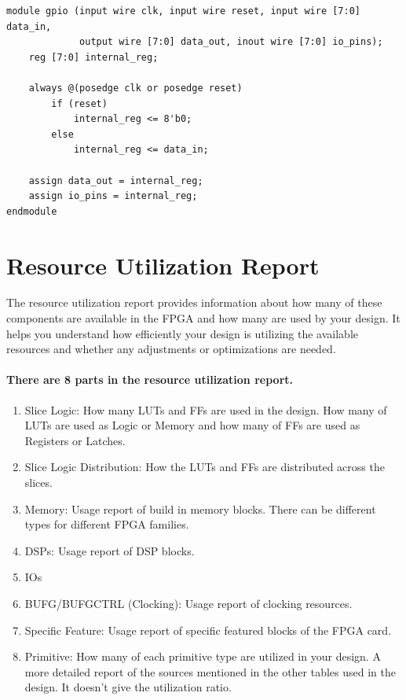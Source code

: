 \documentclass{report}
\begin{document}
\begin{verbatim}
module gpio (input wire clk, input wire reset, input wire [7:0] data_in,
             output wire [7:0] data_out, inout wire [7:0] io_pins);
    reg [7:0] internal_reg;
    
    always @(posedge clk or posedge reset)
        if (reset)
            internal_reg <= 8'b0;
        else
            internal_reg <= data_in;
    
    assign data_out = internal_reg;
    assign io_pins = internal_reg;
endmodule
\end{verbatim}

\section{Resource Utilization Report}

The resource utilization report provides information about how many of these components are available in the FPGA and how many are used by your design. It helps you understand how efficiently your design is utilizing the available resources and whether any adjustments or optimizations are needed.

\paragraph{There are 8 parts in the resource utilization report.}
\begin{enumerate}
    \item Slice Logic: How many LUTs and FFs are used in the design. How many of LUTs are used as Logic or Memory and how many of FFs are used as Registers or Latches.
    \item Slice Logic Distribution: How the LUTs and FFs are distributed across the slices.
    \item Memory: Usage report of build in memory blocks. There can be different types for different FPGA families.
    \item DSPs: Usage report of DSP blocks.
    \item IOs
    \item BUFG/BUFGCTRL (Clocking): Usage report of clocking resources.
    \item Specific Feature: Usage report of specific featured blocks of the FPGA card.
    \item Primitive: How many of each primitive type are utilized in your design. A more detailed report of the sources mentioned in the other tables used in the design. It doesn't give the utilization ratio.
\end{enumerate}
\end{document}
